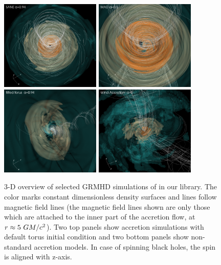 \begin{figure}
  \centering
  \includegraphics[width=0.425\textwidth]{figures/sane_3D_corrected.png}\hspace{1.5pt}%
  \includegraphics[width=0.425\textwidth]{figures/mad_3D_corrected.png}\\
  \includegraphics[width=0.425\textwidth]{figures/tilted_3D_corrected.png}\hspace{1.5pt}%
  \includegraphics[width=0.425\textwidth]{figures/ressler_3D_corrected.png}
  \caption{3-D overview of selected GRMHD simulations of \sgra in our library.
    The color marks constant dimensionless density surfaces and lines follow magnetic field lines (the magnetic field lines shown are only those which are attached to the inner part of the accretion flow, at $r\approx 5~GM/c^2$).
    Two top panels show accretion simulations with default torus initial condition and
    two bottom panels show non-standard accretion models. In case of spinning black holes, the spin is aligned with z-axis.}
  \label{fig:GRMHD}
\end{figure}

